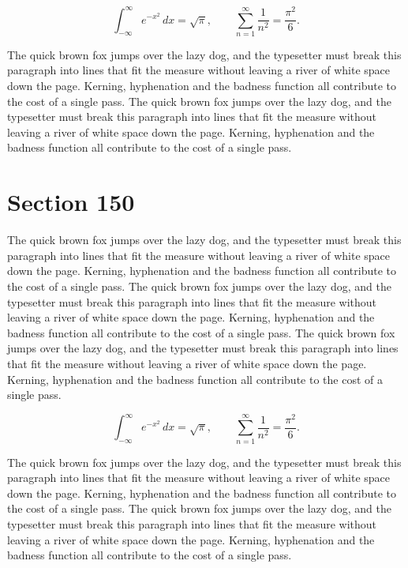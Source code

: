 \documentclass{article}
\begin{document}
\begin{equation}
\int_{-\infty}^{\infty} e^{-x^{2}}\,dx = \sqrt{\pi}, \qquad
\sum_{n=1}^{\infty} \frac{1}{n^{2}} = \frac{\pi^{2}}{6}.
\end{equation}

The quick brown fox jumps over the lazy dog, and the typesetter must break this paragraph into lines that fit the measure without leaving a river of white space down the page. Kerning, hyphenation and the badness function all contribute to the cost of a single pass. The quick brown fox jumps over the lazy dog, and the typesetter must break this paragraph into lines that fit the measure without leaving a river of white space down the page. Kerning, hyphenation and the badness function all contribute to the cost of a single pass. 
\section{Section 150}
The quick brown fox jumps over the lazy dog, and the typesetter must break this paragraph into lines that fit the measure without leaving a river of white space down the page. Kerning, hyphenation and the badness function all contribute to the cost of a single pass. The quick brown fox jumps over the lazy dog, and the typesetter must break this paragraph into lines that fit the measure without leaving a river of white space down the page. Kerning, hyphenation and the badness function all contribute to the cost of a single pass. The quick brown fox jumps over the lazy dog, and the typesetter must break this paragraph into lines that fit the measure without leaving a river of white space down the page. Kerning, hyphenation and the badness function all contribute to the cost of a single pass. 

\begin{equation}
\int_{-\infty}^{\infty} e^{-x^{2}}\,dx = \sqrt{\pi}, \qquad
\sum_{n=1}^{\infty} \frac{1}{n^{2}} = \frac{\pi^{2}}{6}.
\end{equation}

The quick brown fox jumps over the lazy dog, and the typesetter must break this paragraph into lines that fit the measure without leaving a river of white space down the page. Kerning, hyphenation and the badness function all contribute to the cost of a single pass. The quick brown fox jumps over the lazy dog, and the typesetter must break this paragraph into lines that fit the measure without leaving a river of white space down the page. Kerning, hyphenation and the badness function all contribute to the cost of a single pass. 
\end{document}
